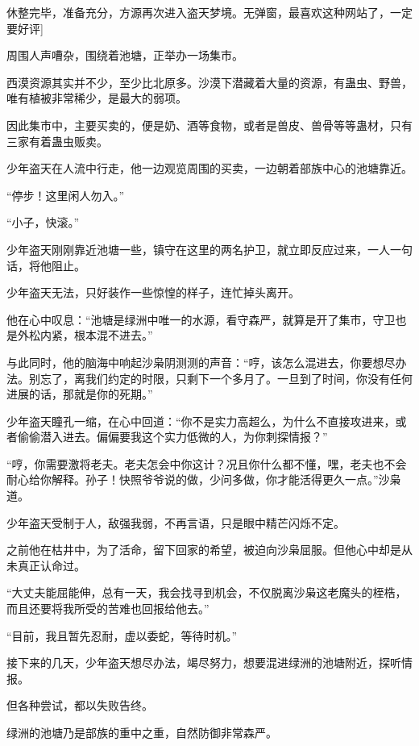 
\begin{this_body}



休整完毕，准备充分，方源再次进入盗天梦境。无弹窗，最喜欢这种网站了，一定要好评]

周围人声嘈杂，围绕着池塘，正举办一场集市。

西漠资源其实并不少，至少比北原多。沙漠下潜藏着大量的资源，有蛊虫、野兽，唯有植被非常稀少，是最大的弱项。

因此集市中，主要买卖的，便是奶、酒等食物，或者是兽皮、兽骨等等蛊材，只有三家有着蛊虫贩卖。

少年盗天在人流中行走，他一边观览周围的买卖，一边朝着部族中心的池塘靠近。

“停步！这里闲人勿入。”

“小子，快滚。”

少年盗天刚刚靠近池塘一些，镇守在这里的两名护卫，就立即反应过来，一人一句话，将他阻止。

少年盗天无法，只好装作一些惊惶的样子，连忙掉头离开。

他在心中叹息：“池塘是绿洲中唯一的水源，看守森严，就算是开了集市，守卫也是外松内紧，根本混不进去。”

与此同时，他的脑海中响起沙枭阴测测的声音：“哼，该怎么混进去，你要想尽办法。别忘了，离我们约定的时限，只剩下一个多月了。一旦到了时间，你没有任何进展的话，那就是你的死期。”

少年盗天瞳孔一缩，在心中回道：“你不是实力高超么，为什么不直接攻进来，或者偷偷潜入进去。偏偏要我这个实力低微的人，为你刺探情报？”

“哼，你需要激将老夫。老夫怎会中你这计？况且你什么都不懂，嘿，老夫也不会耐心给你解释。孙子！快照爷爷说的做，少问多做，你才能活得更久一点。”沙枭道。

少年盗天受制于人，敌强我弱，不再言语，只是眼中精芒闪烁不定。

之前他在枯井中，为了活命，留下回家的希望，被迫向沙枭屈服。但他心中却是从未真正认命过。

“大丈夫能屈能伸，总有一天，我会找寻到机会，不仅脱离沙枭这老魔头的桎梏，而且还要将我所受的苦难也回报给他去。”

“目前，我且暂先忍耐，虚以委蛇，等待时机。”

接下来的几天，少年盗天想尽办法，竭尽努力，想要混进绿洲的池塘附近，探听情报。

但各种尝试，都以失败告终。

绿洲的池塘乃是部族的重中之重，自然防御非常森严。


\end{this_body}
